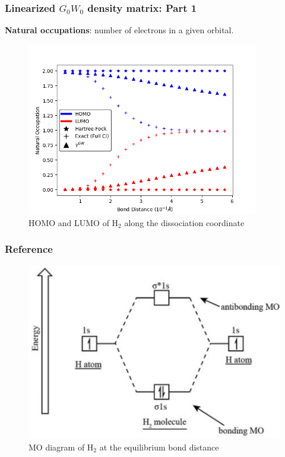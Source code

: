 \documentclass{beamer}
\begin{document}
\begin{frame}
    \frametitle{\textcolor{caltechorange}{Linearized $G_0W_0$ density matrix\autocite{bruneval_improved_2021}: Part 1}}
\textbf{Natural occupations}:  number of electrons in a given orbital.\autocite{szabo_modern_2012}
\begin{figure}[h]
    \includegraphics[width=0.9\textwidth]{h2_occupations.png}
\caption{HOMO and LUMO of $\mathrm{H_2}$ along the dissociation coordinate}

\end{figure}
\end{frame}
\begin{frame}
\frametitle{\textcolor{caltechorange}{Reference}}
    \begin{figure}[h]
    \centering
    \includegraphics[width=\textwidth]{h2_mo.png}
\caption{MO diagram of $\mathrm{H_2}$ at the equilibrium bond distance \autocite{noauthor_molecular_nodate}}
\label{fig:h2_mo_diagram}
\end{figure}
\end{frame}
\end{document}
